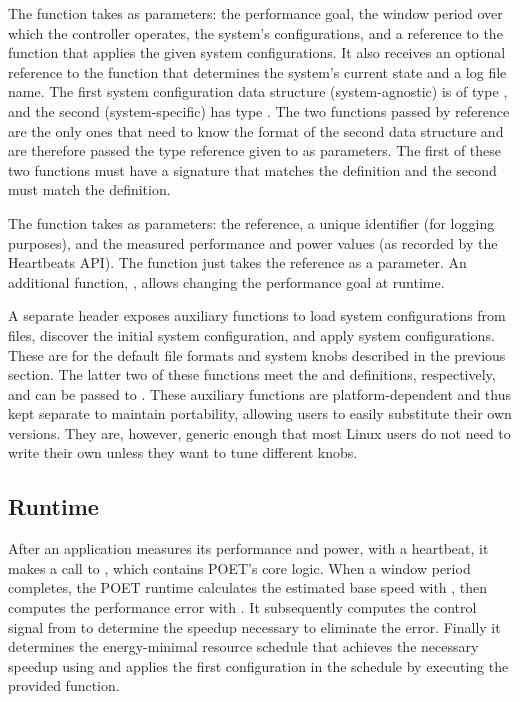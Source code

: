 The  function takes as parameters: the performance goal, the window period over which the controller operates, the system's configurations, and a reference to the function that applies the given system configurations.
It also receives an optional reference to the function that determines the system's current state and a log file name.
The first system configuration data structure (system-agnostic) is of type , and the second (system-specific) has type .
The two functions passed by reference are the only ones that need to know the format of the second data structure and are therefore passed the  type reference given to  as parameters.
The first of these two functions must have a signature that matches the  definition and the second must match the  definition.

The  function takes as parameters: the  reference, a unique identifier (for logging purposes), and the measured performance and power values (\eg as recorded by the Heartbeats API).
The  function just takes the  reference as a parameter.
An additional function, , allows changing the performance goal at runtime.

A separate header exposes auxiliary functions to load system configurations from files, discover the initial system configuration, and apply system configurations.
These are for the default file formats and system knobs described in the previous section.
The latter two of these functions meet the  and  definitions, respectively, and can be passed to .
These auxiliary functions are platform-dependent and thus kept separate to maintain portability, allowing users to easily substitute their own versions.
They are, however, generic enough that most Linux users do not need to write their own unless they want to tune different knobs.


\subsection{Runtime}
\label{sec:poet-impl-runtime}

After an application measures its performance and power, \eg with a heartbeat, it makes a call to , which contains POET's core logic.
When a window period completes, the POET runtime calculates the estimated base speed with , then computes the performance error with .
It subsequently computes the control signal from  to determine the speedup necessary to eliminate the error.
Finally it determines the energy-minimal resource schedule that achieves the necessary speedup using  and applies the first configuration in the schedule by executing the provided  function.

